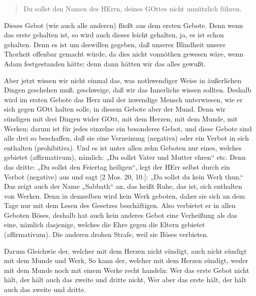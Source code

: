 \begin{quote}
Du sollst den Namen des HErrn, deines GOttes nicht unnützlich führen.
\end{quote}

Dieses Gebot (wie auch alle anderen) fließt aus dem ersten Gebote. Denn wenn das erste gehalten ist, so wird auch dieses leicht gehalten, ja, es ist schon gehalten. Denn es ist um deswillen gegeben, daß unserer Blindheit unsere Thorheit offenbar gemacht würde, da dies nicht vonnöthen gewesen wäre, wenn Adam festgestanden hätte; denn dann hätten wir das alles gewußt.

Aber jetzt wissen wir nicht einmal das, was nothwendiger Weise in äußerlichen Dingen geschehen muß, geschweige, daß wir das Innerliche wissen sollten. Deshalb wird im ersten Gebote das Herz und der inwendige Mensch unterwiesen, wie er sich gegen GOtt halten solle, in diesem Gebote aber der Mund. Denn wir sündigen mit drei Dingen wider GOtt, mit dem Herzen, mit dem Munde, mit Werken; darum ist für jedes einzelne ein besonderes Gebot, und diese Gebote sind alle drei so beschaffen, daß sie eine Verneinung (negativa) oder ein Verbot in sich enthalten (prohibitiva). Und es ist unter allen zehn Geboten nur eines, welches gebietet (affirmativum), nämlich: „Du sollst Vater und Mutter ehren“ etc. Denn das dritte: „Du sollst den Feiertag heiligen“, legt der HErr selbst durch ein Verbot (negative) aus und sagt [2 Mos. 20, 10.]: „Da sollst du kein Werk thun.“ Das zeigt auch der Name „Sabbath“ an, das heißt Ruhe, das ist, sich enthalten von Werken. Denn in demselben wird kein Werk geboten, daher sie sich an dem Tage nur mit dem Lesen des Gesetzes beschäftigen. Also verbietet er in allen Geboten Böses, deshalb hat auch kein anderes Gebot eine Verheißung als das eine, nämlich dasjenige, welches die Ehre gegen die Eltern gebietet (affirmativum). Die anderen drohen Strafe, weil sie Böses verbieten.

Darum Gleichwie der, welcher mit dem Herzen nicht sündigt, auch nicht sündigt mit dem Munde und Werk, So kann der, welcher mit dem Herzen sündigt, weder mit dem Munde noch mit einem Werke recht handeln: Wer das erste Gebot nicht hält, der hält auch das zweite und dritte nicht, Wer aber das erste hält, der hält auch das zweite und dritte.

